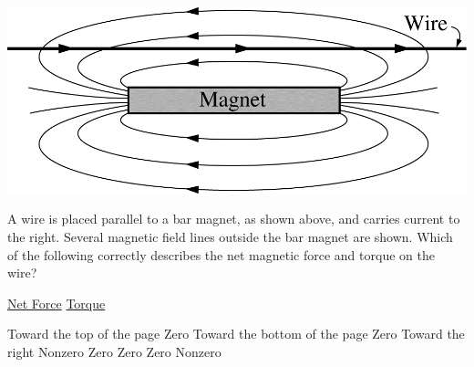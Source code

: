 \begin{center}
\includegraphics[scale=0.25]{images/img-013-027.png}
\end{center}

\begin{questions}\setcounter{question}{28}\question
A wire is placed parallel to a bar magnet, as shown above, and carries current to the right. Several magnetic field lines outside the bar magnet are shown. Which of the following correctly describes the net magnetic force and torque on the wire?

\tabto{0.75cm}\underline{Net Force}
\tabto{7.00cm}\underline{Torque}

\begin{choices}
\choice Toward the top of the page    \tabto{6.25cm} Zero
\choice Toward the bottom of the page \tabto{6.25cm} Zero
\choice Toward the right              \tabto{6.25cm} Nonzero
\choice Zero                          \tabto{6.25cm} Zero
\choice Zero                          \tabto{6.25cm} Nonzero
\end{choices}\end{questions}

